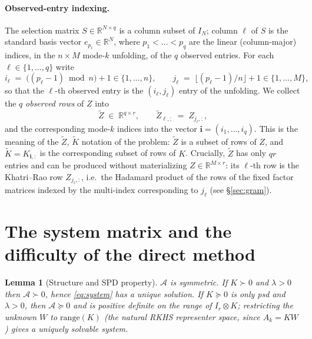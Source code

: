 \documentclass[12pt]{article}
\newcommand{\bR}{\mathbb{R}}
\newtheorem{lemma}{Lemma}
\begin{document}
\paragraph{Observed-entry indexing.}
The selection matrix $S\in\bR^{N\times q}$ is a column subset of $I_N$; column
$\ell$ of $S$ is the standard basis vector $e_{p_\ell}\in\bR^{N}$, where
$p_1<\dots<p_q$ are the linear (column-major) indices, in the $n\times M$ mode-$k$
unfolding, of the $q$ observed entries. For each $\ell\in\{1,\dots,q\}$ write
\begin{equation}\label{eq:rowscols}
  i_\ell \;=\; \big((p_\ell-1)\bmod n\big)+1\in\{1,\dots,n\},
  \qquad
  j_\ell \;=\; \big\lfloor (p_\ell-1)/n\big\rfloor +1\in\{1,\dots,M\},
\end{equation}
so that the $\ell$-th observed entry is the $(i_\ell,j_\ell)$ entry of the
unfolding. We collect the $q$ \emph{observed rows} of $Z$ into
\begin{equation}\label{eq:Ztilde}
  \widetilde Z\;\in\;\bR^{q\times r},
  \qquad \widetilde Z_{\ell,:}\;=\;Z_{j_\ell,:},
\end{equation}
and the corresponding mode-$k$ indices into the vector $\mathbf{i}=(i_1,\dots,i_q)$.
This is the meaning of the $\widetilde Z$, $\widetilde K$ notation of the problem:
$\widetilde Z$ is a subset of rows of $Z$, and $\widetilde K=K_{\mathbf{i},:}$ is
the corresponding subset of rows of $K$. Crucially, $\widetilde Z$ has only $qr$
entries and can be produced without materializing $Z\in\bR^{M\times r}$:
its $\ell$-th row is the Khatri--Rao row $Z_{j_\ell,:}$, i.e.\ the Hadamard
product of the rows of the fixed factor matrices indexed by the multi-index
corresponding to $j_\ell$ (see \S\ref{sec:gram}).

\section{The system matrix and the difficulty of the direct method}

\begin{lemma}[Structure and SPD property]\label{lem:spd}
$\mathcal{A}$ is symmetric. If $K\succ0$ and $\lambda>0$ then $\mathcal{A}\succ0$,
hence \eqref{eq:system} has a unique solution. If $K\succeq0$ is only psd and
$\lambda>0$, then $\mathcal{A}\succeq0$ and is positive definite on the range
of $I_r\otimes K$; restricting the unknown $W$ to $\mathrm{range}(K)$ (the
natural RKHS representer space, since $A_k=KW$) gives a uniquely solvable system.
\end{lemma}
\end{document}
